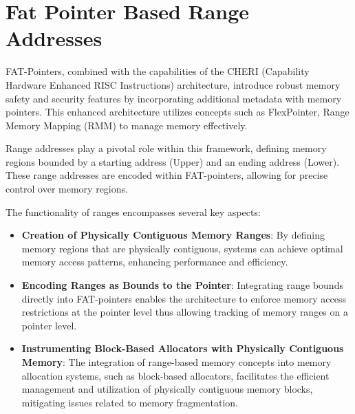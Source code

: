 \chapter{Fat Pointer Based Range Addresses}

\ifpdf
    \graphicspath{{Fat-Pointer-Based-Range-Address/Figs/Raster/}{Fat-Pointer-Based-Range-Address/Figs/PDF/}{Fat-Pointer-Based-Range-Address/Figs/}}
\else
    \graphicspath{{Fat-Pointer-Based-Range-Address/Figs/Vector/}{Fat-Pointer-Based-Range-Address/Figs/}}
\fi


FAT-Pointers, combined with the capabilities of the CHERI (Capability Hardware Enhanced RISC Instructions) 
architecture, introduce robust memory safety and security features by incorporating additional metadata 
with memory pointers. This enhanced architecture utilizes concepts such as FlexPointer, 
Range Memory Mapping (RMM) to manage memory effectively.

Range addresses play a pivotal role within this framework, defining memory 
regions bounded by a starting address (Upper) and an ending address (Lower). 
These range addresses are encoded within FAT-pointers, allowing for precise 
control over memory regions.

The functionality of ranges encompasses several key aspects:
\begin{itemize}
\item \textbf{Creation of Physically Contiguous Memory Ranges}:
By defining memory regions that are physically contiguous, systems can 
achieve optimal memory access patterns, enhancing performance and efficiency.
\item \textbf{Encoding Ranges as Bounds to the Pointer}:
Integrating range bounds directly into FAT-pointers enables the architecture 
to enforce memory access restrictions at the pointer level thus allowing 
tracking of memory ranges on a pointer level.
\item \textbf{Instrumenting Block-Based Allocators with Physically Contiguous Memory}:
The integration of range-based memory concepts into memory allocation systems, such as block-based 
allocators, facilitates the efficient management and utilization of physically contiguous memory blocks, 
mitigating issues related to memory fragmentation.
\end{itemize}

